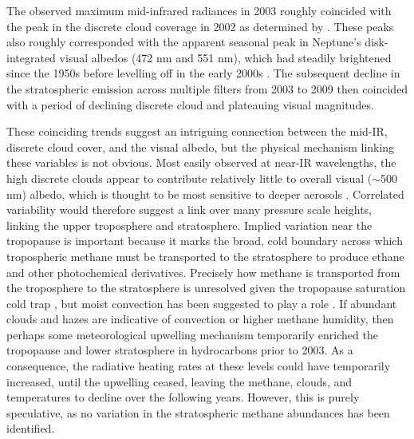 \documentclass[twocolumn,10pt]{aastex631}
\begin{document}
The observed maximum mid-infrared radiances in 2003 roughly coincided with the peak in the discrete cloud coverage in 2002 as determined by \citet{karkoschka2011neptune}.  These peaks also roughly corresponded with the apparent seasonal peak in Neptune's disk-integrated visual albedos (472 nm and 551 nm), which had steadily brightened since the 1950s before levelling off in the early 2000s \citep{lockwood2002photometric, sromovsky2003seasonal_response, lockwood2006photometric, lockwood2019final}. The subsequent decline in the stratospheric emission across multiple filters from 2003 to 2009 then coincided with a period of declining discrete cloud and plateauing visual magnitudes.

These coinciding trends suggest an intriguing connection between the mid-IR, discrete cloud cover, and the visual albedo, but the physical mechanism linking these variables is not obvious.  Most easily observed at near-IR wavelengths, the high discrete clouds appear to contribute relatively little to overall visual ($\sim$500 nm) albedo, which is thought to be most sensitive to deeper aerosols \citep{karkoschka2011neptune}. Correlated variability would therefore suggest a link over many pressure scale heights, linking the upper troposphere and stratosphere.  Implied variation near the tropopause is important because it marks the broad, cold boundary across which tropospheric methane must be transported to the stratosphere to produce ethane and other photochemical derivatives.  Precisely how methane is transported from the troposphere to the stratosphere is unresolved given the tropopause saturation cold trap \citep{smith1989voyager, baines_UV_neptune_1990,orton2007evidencehotspot, dePater2014neptune}, but moist convection has been suggested to play a role \citep{stoker1986moist,lunine1989abundance, sinclair2020spatial}. If abundant clouds and hazes are indicative of convection or higher methane humidity, then perhaps some meteorological upwelling mechanism temporarily enriched the tropopause and lower stratosphere in hydrocarbons prior to 2003.  As a consequence, the radiative heating rates at these levels could have temporarily increased, until the upwelling ceased, leaving the methane, clouds, and temperatures to decline over the following years.  However, this is purely speculative, as no variation in the stratospheric methane abundances has been identified.  
\end{document}
